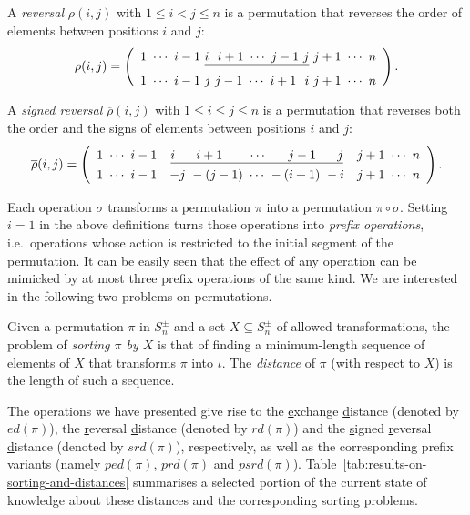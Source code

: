 \documentclass[review]{elsarticle}
\newcommand{\ie}{i.e.\ }
\begin{document}
\begin{definition}
A \emph{reversal} $\rho(i, j)$ with $1\leq i<j\leq n$ is a permutation that reverses the order of elements between positions $i$ and $j$:
$$
\rho(i, j)=\left(
\begin{array}{l}\renewcommand{\arraystretch}{1.3}
1\ \cdots\ i-1\ \underline{i\ \ i+1\ \cdots\ j-1\ j}\ j+1\ \cdots\ n\\
\raisebox{-.05in}{$1\ \cdots\ i-1\ j\ j-1\ \cdots\ i+1\ \ i\ j+1\ \cdots\ n$}
\end{array}
\right).
$$
\end{definition}

\begin{definition}
A \emph{signed reversal} $\overline{\rho}(i, j)$ with $1\leq i\leq j\leq n$ is a permutation that reverses both the order and the signs of elements between positions $i$ and $j$:
$$
\overline{\rho}(i, j)=\left(
\begin{array}{ccc}\renewcommand{\arraystretch}{1.3}
1\ \cdots\ i-1 & \underline{i\ \ \ \ \ i+1\ \ \ \ \ \ \cdots\ \ \ \ \ j-1\ \ \ \ \ j} & j+1\ \cdots\ n\\
1\ \cdots\ i-1 & -j\ -(j-1)\ \cdots\ -(i+1)\ -i     & j+1\ \cdots\ n
\end{array}
\right).
$$
\end{definition}

Each operation $\sigma$ transforms a permutation $\pi$ into a permutation $\pi\circ\sigma$. Setting $i=1$ in the above definitions turns those operations into \emph{prefix operations}, \ie operations whose action is restricted to the initial segment of the permutation. It can be easily seen that the effect of any operation can be mimicked by at most three prefix operations of the same kind. 
We are interested in the following two problems on permutations.

\begin{definition}
Given a permutation $\pi$ in $S^{\pm}_n$ and a set $X\subseteq S^{\pm}_n$ of allowed transformations, the problem of \emph{sorting $\pi$ by $X$} is that of finding a minimum-length sequence of elements of $X$ that transforms $\pi$ into $\iota$. The \emph{distance} of $\pi$ (with respect to $X$) is the length of such a sequence.
\end{definition}

The operations we have presented give rise to the \underline{e}xchange \underline{d}istance (denoted by $ed(\pi)$), the \underline{r}eversal \underline{d}istance (denoted by $rd(\pi)$) and the \underline{s}igned \underline{r}eversal \underline{d}istance (denoted by $srd(\pi)$), respectively, as well as the corresponding prefix variants (namely $ped(\pi)$, $prd(\pi)$ and $psrd(\pi)$). Table~\ref{tab:results-on-sorting-and-distances} summarises a selected portion of the current state of knowledge about these distances and the corresponding sorting problems.
\end{document}
